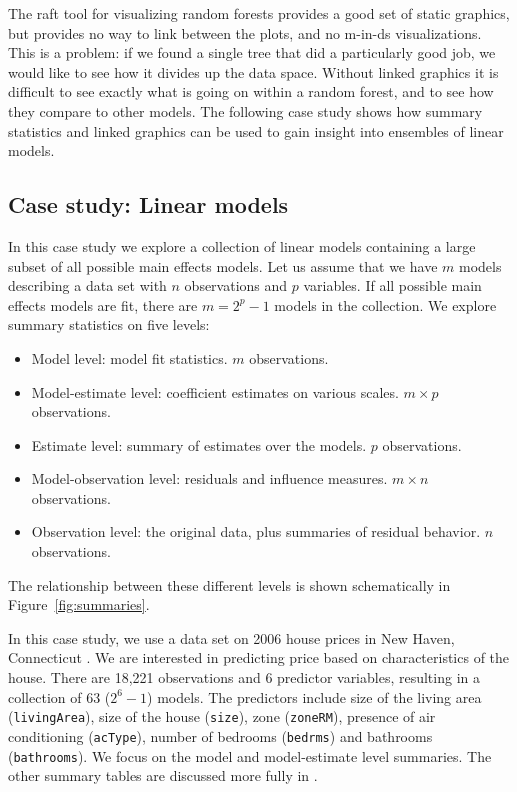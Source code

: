 \documentclass[preprint]{imsart}
\begin{document}
The {\sc raft} tool \citep{raft} for visualizing random forests provides a good set of static graphics, but provides no way to link between the plots, and no m-in-ds visualizations. This is a problem: if we found a single tree that did a particularly good job, we would like to see how it divides up the data space. Without linked graphics it is difficult to see exactly what is going on within a random forest, and to see how they compare to other models.  The following case study shows how summary statistics and linked graphics can be used to gain insight into ensembles of linear models.

\subsection{Case study: Linear models}
\label{sec:linear-models}

In this case study we  explore a collection of linear models containing a large subset of all possible main effects models. Let us assume that we have $m$ models describing a data set with $n$ observations and $p$ variables. If all possible main effects models are fit, there are $m = 2^p - 1$ models in the collection. We  explore summary statistics on five levels:

\begin{itemize} \itemsep 0in
  \item Model level: model fit statistics.  $m$ observations.
  \item Model-estimate level: coefficient estimates on various scales.  $m \times p$ observations.
  \item Estimate level: summary of estimates over the models.  $p$ observations.
  \item Model-observation level: residuals and influence measures.  $m \times n$ observations.
  \item Observation level: the original data, plus summaries of residual behavior. $n$ observations.
\end{itemize}

\noindent The relationship between these different levels is shown schematically in Figure~\ref{fig:summaries}.

In this case study, we  use a data set on 2006 house prices in New Haven, Connecticut \citep{emerson}. We are interested in predicting price based on characteristics of the house. There are 18,221 observations and 6 predictor variables, resulting in a collection of 63 ($2^6 - 1$) models. The predictors include size of the living area ({\tt livingArea}), size of the house ({\tt size}), zone ({\tt zoneRM}), presence of air conditioning ({\tt acType}), number of bedrooms ({\tt bedrms}) and bathrooms ({\tt bathrooms}). We  focus on the  model and model-estimate level summaries. The other summary tables are discussed more fully in \citet{wickham:2007h}.
\end{document}
